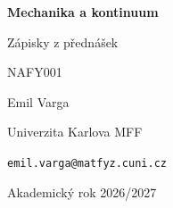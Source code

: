 \documentclass[11pt,a4paper,oneside]{report}
\theoremstyle{mystyle}
\begin{document}
\begin{titlepage}
    \centering
    \vspace*{2cm}
    {\Huge\bfseries Mechanika a kontinuum\par}
    \vspace{0.8cm}
    {\Large Zápisky z přednášek\par}
    \vspace{0.3cm}
    {\large NAFY001\par}
    \vfill
    {Emil Varga\par}
    \vspace{0.2cm}
    {\small Univerzita Karlova MFF\par}
    {\small \texttt{emil.varga@matfyz.cuni.cz}\par}
    \vspace{1.5cm}
    {\large Akademický rok 2026/2027\par}
\end{titlepage}


\tableofcontents
\newpage



\newpage
{}







\end{document}
